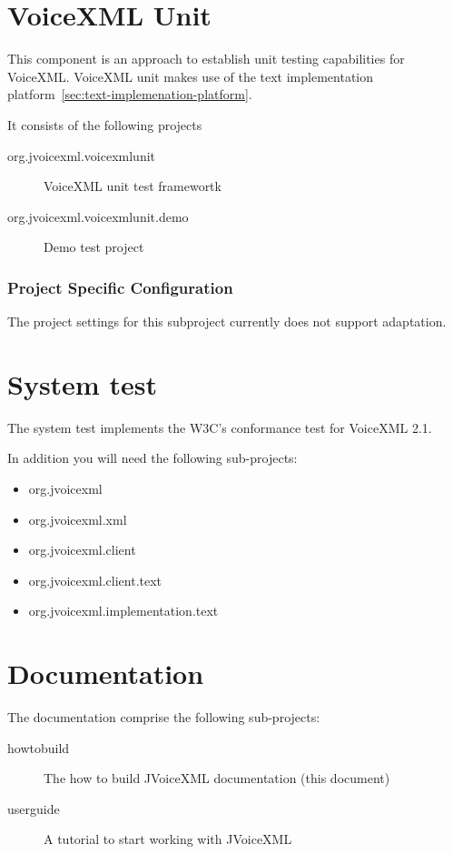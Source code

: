 \documentclass[11pt,a4paper]{article}
\begin{document}
\section{VoiceXML Unit}
\label{voicexml-unit}

This component is an approach to establish unit testing capabilities for
VoiceXML. VoiceXML unit makes use of the text implementation platform~\ref{sec:text-implemenation-platform}.

It consists of the following projects
\begin{description}
\item[org.jvoicexml.voicexmlunit] VoiceXML unit test framewortk
\item[org.jvoicexml.voicexmlunit.demo] Demo test project
\end{description}

\subsubsection{Project Specific Configuration}

The project settings for this subproject currently does not support adaptation.

\section{System test}

The system test implements the W3C's conformance test for VoiceXML 2.1.

In addition you will need the following sub-projects:
\begin{itemize}
\item org.jvoicexml
\item org.jvoicexml.xml
\item org.jvoicexml.client
\item org.jvoicexml.client.text
\item org.jvoicexml.implementation.text
\end{itemize} 

\section{Documentation}

The documentation comprise the following sub-projects:

\begin{description}
\item[howtobuild] The how to build JVoiceXML documentation (this document)
\item[userguide] A tutorial to start working with JVoiceXML
\end{description}
\end{document}
